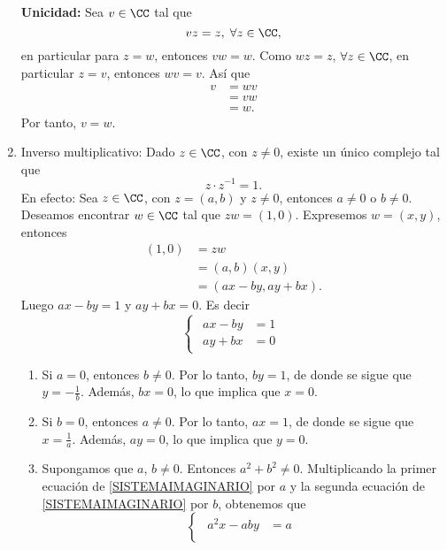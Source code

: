 \begin{enumerate}[resume,label=A\arabic*.]
    \textbf{Unicidad:} Sea $v \in \CC$ tal que
    $$vz = z, \; \forall z \in \CC,$$
    en particular para $z = w$, entonces $vw = w$. Como $wz = z$, $\forall z \in \CC$, en particular $z = v$, entonces $wv = v$. Así que
    \begin{align*}
        v & = wv \\
        & = vw \\
        & = w.
    \end{align*}
    Por tanto, $v = w$.
    \item Inverso multiplicativo: Dado $z \in \CC$, con $z \neq 0$, existe un único complejo tal que
    $$z \cdot z^{-1} = 1.$$
    En efecto: Sea $z \in \CC$, con $z = (a, b)$ y $z \neq 0$, entonces $a \neq 0$ o $b \neq 0$. Deseamos encontrar $w \in \CC$ tal que $zw = (1, 0)$. Expresemos $w = (x, y)$, entonces
    \begin{align*}
        (1, 0) &= zw \\
        & = (a, b)(x, y) \\
        & = (ax - by, ay + bx).
    \end{align*}
    Luego $ax - by = 1$ y $ay + bx = 0$. Es decir
    \begin{equation}
        \begin{cases}
            \begin{aligned}
                ax - by & = 1 \\
                ay + bx & = 0
            \end{aligned}
        \end{cases} \label{SISTEMAIMAGINARIO}
    \end{equation}
    \begin{enumerate}[label=\roman*.]
        \item Si $a = 0$, entonces $b \neq 0$. Por lo tanto, $by = 1$, de donde se sigue que $\displaystyle y = -\frac{1}{b}$. Además, $bx = 0$, lo que implica que $x = 0$.
        \item Si $b = 0$, entonces $a \neq 0$. Por lo tanto, $ax = 1$, de donde se sigue que $\displaystyle x = \frac{1}{a}$. Además, $ay = 0$, lo que implica que $y = 0$.
        \item Supongamos que $a$, $b \neq 0$. Entonces $a^2 + b^2 \neq 0$. Multiplicando la primer ecuación de \eqref{SISTEMAIMAGINARIO} por $a$ y la segunda ecuación de \eqref{SISTEMAIMAGINARIO} por $b$, obtenemos que
        $$\begin{cases}
            \begin{aligned}
                a^2x - aby & = a \\

\end{aligned}
\end{cases}$$
\end{enumerate}
\end{enumerate}

